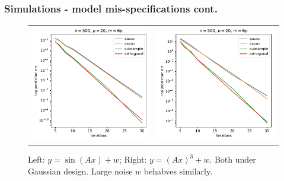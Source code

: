 \documentclass{beamer}
\begin{document}
\begin{frame}
    \frametitle{Simulations - model mis-specifications cont.}

    \begin{figure}
        \begin{center}
            \begin{tabular}{ll}
                \includegraphics[scale=0.32]{sin_transform_err_vs_iter_n500_p20_m120.pdf}
                &
                \includegraphics[scale=0.32]{cubic_transform_err_vs_iter_n500_p20_m120.pdf}
            \end{tabular}
            \caption{Left: $y=\sin(Ax) + w$; Right: $y=(Ax)^3 + w$. Both
            under Gaussian design. Large noise $w$ behabves similarly.}
        \end{center}
    \end{figure}
\end{frame}
\end{document}
